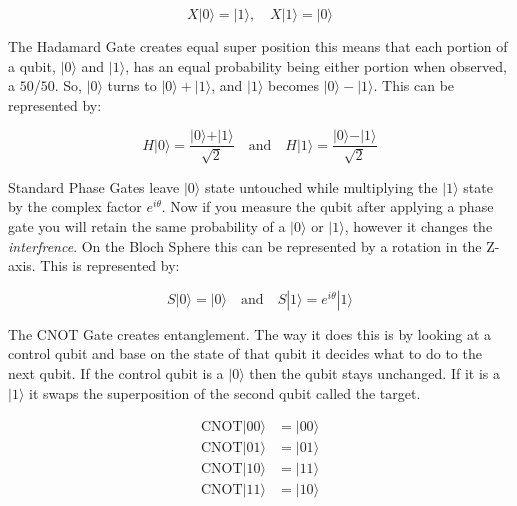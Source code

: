 \documentclass[12pt]{article}
\begin{document}
\begin{equation*}
X|0\rangle = |1\rangle, \quad X|1\rangle = |0\rangle
\end{equation*}
\vspace{0.1cm}

The Hadamard Gate creates equal super position this means that each portion of a qubit, $|0\rangle$ and $|1\rangle$, has an equal probability being either portion when observed, a $50$/$50$. So, $|0\rangle$ turns to $|0\rangle + |1\rangle$, and $|1\rangle$ becomes $|0\rangle - |1\rangle$. This can be represented by:

\begin{equation*}
H\vert 0 \rangle = \frac{\vert 0 \rangle + \vert 1 \rangle}{\sqrt{2}} \quad \text{and} \quad H\vert 1 \rangle = \frac{\vert 0 \rangle - \vert 1 \rangle}{\sqrt{2}}
\end{equation*}
\vspace{0.1cm}

Standard Phase Gates leave $|0\rangle$ state untouched while multiplying the $|1\rangle$ state by the complex factor $e^{i\theta}$. Now if you measure the qubit after applying a phase gate you will retain the same probability of a $|0\rangle$ or $|1\rangle$, however it changes the \textit{interfrence}. On the Bloch Sphere this can be represented by a rotation in the Z-axis. This is represented by:

\begin{equation*}
S|0\rangle = |0\rangle \quad \text{and} \quad S|1\rangle = e^{i\theta}|1\rangle
\end{equation*}
\vspace{0.1cm}

The CNOT Gate creates entanglement. The way it does this is by looking at a control qubit and base on the state of that qubit it decides what to do to the next qubit. If the control qubit is a $|0\rangle$ then the qubit stays unchanged. If it is a $|1\rangle$ it swaps the superposition of the second qubit called the target.

\begin{equation*}
\begin{aligned}
\text{CNOT}\lvert 00 \rangle &= \lvert 00 \rangle \\
\text{CNOT}\lvert 01 \rangle &= \lvert 01 \rangle \\
\text{CNOT}\lvert 10 \rangle &= \lvert 11 \rangle \\
\text{CNOT}\lvert 11 \rangle &= \lvert 10 \rangle 
\end{aligned}
\end{equation*}
\vspace{0.1cm}
\end{document}
